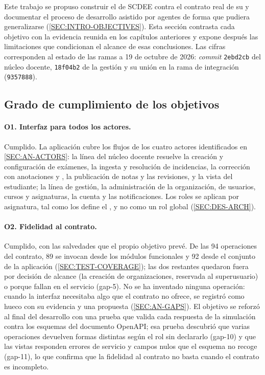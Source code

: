 Este trabajo se propuso construir el  de SCDEE contra el contrato real de su
 y documentar el proceso de desarrollo asistido por agentes de forma que pudiera
generalizarse (\cref{SEC:INTRO-OBJECTIVES}). Esta sección contrasta cada objetivo con la
evidencia reunida en los capítulos anteriores y expone después las limitaciones que
condicionan el alcance de esas conclusiones. Las cifras corresponden al estado de las ramas
a 19 de octubre de 2026: \textit{commit} \texttt{2ebd2cb} del núcleo docente,
\texttt{18f04b2} de la gestión y su unión en la rama de integración
(\texttt{9357888}).

\subsection{Grado de cumplimiento de los objetivos}

\paragraph{O1. Interfaz para todos los actores.} Cumplido. La aplicación cubre los flujos de
los cuatro actores identificados en \cref{SEC:AN-ACTORS}: la línea del núcleo docente
resuelve la creación y configuración de exámenes, la ingesta y resolución de incidencias,
la corrección con anotaciones y , la publicación de notas y las revisiones,
y la vista del estudiante; la línea de gestión, la administración de la organización, de
usuarios, cursos y asignaturas, la cuenta y las notificaciones. Los roles se aplican por
asignatura, tal como los define el , y no como un rol global
(\cref{SEC:DES-ARCH}).

\paragraph{O2. Fidelidad al contrato.} Cumplido, con las salvedades que el propio objetivo
prevé. De las 94 operaciones del contrato, 89 se invocan desde los módulos funcionales y 92
desde el conjunto de la aplicación (\cref{SEC:TEST-COVERAGE}); las dos restantes quedaron
fuera por decisión de alcance (la creación de organizaciones, reservada al superusuario) o
porque fallan en el servicio (gap-5). No se ha inventado
ninguna operación: cuando la interfaz necesitaba algo que el contrato no ofrece, se
registró como hueco con su evidencia y una propuesta (\cref{SEC:AN-GAPS}). El objetivo se
reforzó al final del desarrollo con una prueba que valida cada respuesta de la simulación
contra los esquemas del documento OpenAPI; esa prueba descubrió que varias operaciones
devuelven formas distintas según el rol sin declararlo (gap-10) y que las vistas responden
errores de servicio y campos nulos que el esquema no recoge (gap-11), lo que confirma que la
fidelidad al contrato no basta cuando el contrato es incompleto.

